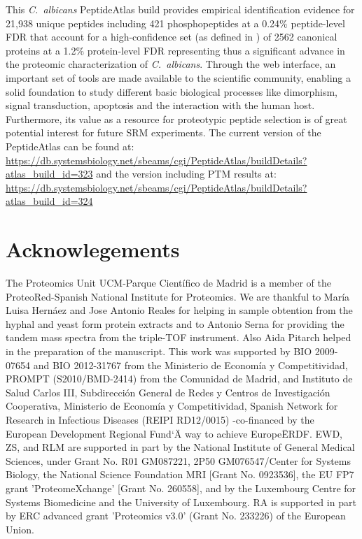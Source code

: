 This \textit{\mbox{C. albicans}} PeptideAtlas build provides empirical identification
 evidence for 21,938 unique peptides including 421
phosphopeptides at a 0.24\% peptide-level FDR that account for a
high-confidence set (as defined in \citep{Farrah2011}) of 2562 canonical proteins
at a 1.2\% protein-level FDR representing thus a significant
advance in the proteomic characterization of \textit{\mbox{C. albicans}}.
Through the web interface, an important set of tools are
made available to the scientific community, enabling a solid
foundation to study different basic biological processes like
dimorphism, signal transduction, apoptosis and the interaction
with the human host. Furthermore, its value as a resource for
proteotypic peptide selection is of great potential interest for
future SRM experiments.
The current version of the PeptideAtlas can be found
at: 
\href{https://db.systemsbiology.net/sbeams/cgi/PeptideAtlas/buildDetails?atlas_build_id=323}{https://db.systemsbiology.net/sbeams/cgi/PeptideAtlas/buildDetails?atlas\_build\_id=323}
and the version including PTM results at:\newline{}
\href{https://db.systemsbiology.net/sbeams/cgi/PeptideAtlas/buildDetails?atlas_build_id=324}{https://db.systemsbiology.net/sbeams/cgi/PeptideAtlas/buildDetails?atlas\_build\_id=324}


\section*{Acknowlegements}
The Proteomics Unit UCM-Parque Cient\'ifico de Madrid is a
member of the ProteoRed-Spanish National Institute for
Proteomics.
We are thankful to Mar\'ia Luisa Hern\'aez and Jose Antonio
Reales for helping in sample obtention from the hyphal and
yeast form protein extracts and to Antonio Serna for providing
the tandem mass spectra from the triple-TOF instrument. Also
Aida Pitarch helped in the preparation of the manuscript.
This work was supported by BIO 2009-07654 and BIO
2012-31767 from the Ministerio de Econom\'ia y Competitividad,
PROMPT (S2010/BMD-2414) from the Comunidad de Madrid, and
Instituto de Salud Carlos III, Subdirecci\'on General de Redes y
Centros de Investigaci\'on Cooperativa, Ministerio de Econom\'ia y
Competitividad, Spanish Network for Research in Infectious
Diseases (REIPI RD12/0015) -co-financed by the European
Development Regional Fund`\"A way to achieve Europe\" ERDF.
EWD, ZS, and RLM are supported in part by the National
Institute of General Medical Sciences, under Grant No. R01
GM087221, 2P50 GM076547/Center for Systems Biology, the
National Science Foundation MRI [Grant No. 0923536], the EU
FP7 grant 'ProteomeXchange' [Grant No. 260558], and by the
Luxembourg Centre for Systems Biomedicine and the University
of Luxembourg.
RA is supported in part by ERC advanced grant 'Proteomics
v3.0' (Grant No. 233226) of the European Union.


